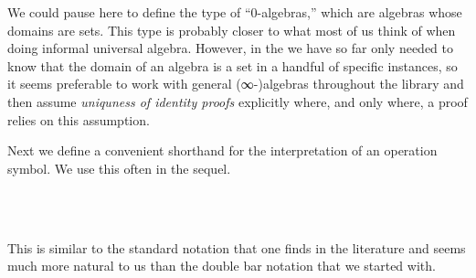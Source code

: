 \documentclass[a4paper,UKenglish,cleveref,autoref,thm-restate]{lipics-v2021}
\begin{document}
We could pause here to define the type of ``0-algebras,'' which are algebras whose domains are sets. This type is probably closer to what most of us think of when doing informal universal algebra. However, in the \ualib we have so far only needed to know that the domain of an algebra is a set in a handful of specific instances, so it seems preferable to work with general (∞-)algebras throughout the library and then assume \emph{uniquness of identity proofs} explicitly where, and only where, a proof relies on this assumption.










Next we define a convenient shorthand for the interpretation of an operation symbol. We use this often in the sequel.
\ccpad
\begin{code}%
\>[0][@{}l@{\AgdaIndent{1}}]%
\>[1]\AgdaSpace{}%
\AgdaSymbol{:}\AgdaSpace{}%
\AgdaSymbol{(}\AgdaSpace{}%
\AgdaSymbol{:}\AgdaSpace{}%
\AgdaSpace{}%
\AgdaSpace{}%
\AgdaSymbol{)(}\AgdaSpace{}%
\AgdaSymbol{:}\AgdaSpace{}%
\AgdaSpace{}%
\AgdaSpace{}%
\AgdaSymbol{)}\AgdaSpace{}%
\AgdaSpace{}%
\AgdaSymbol{(}\AgdaSpace{}%
\AgdaSpace{}%
\AgdaSpace{}%
%
\>[48]%
\>[51]\AgdaSpace{}%
\AgdaSpace{}%
\AgdaSymbol{)}\AgdaSpace{}%
\AgdaSpace{}%
\AgdaSpace{}%
\AgdaSpace{}%
\<%
\\
%
\\[\AgdaEmptyExtraSkip]%
%
\>[1]\AgdaSpace{}%
\AgdaSpace{}%
\AgdaSpace{}%
\AgdaSymbol{=}\AgdaSpace{}%
\AgdaSpace{}%
\AgdaSpace{}%
\AgdaSpace{}%
\AgdaSymbol{(}\AgdaSpace{}%
\AgdaSpace{}%
\AgdaSpace{}%
\AgdaSymbol{)}\AgdaSpace{}%
\<%
\end{code}
\ccpad
This is similar to the standard notation that one finds in the literature and seems much more natural to us than the double bar notation that we started with.
\end{document}
